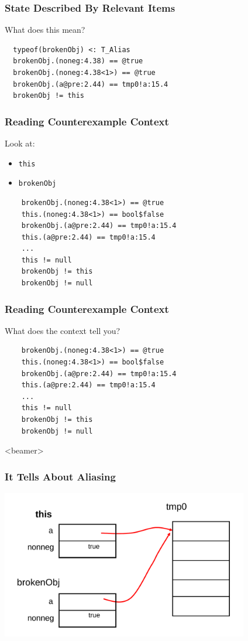 \begin{frame}[fragile]
\frametitle{State Described By Relevant Items}

\begin{question}
What does this mean?

\begin{verbatim}
  typeof(brokenObj) <: T_Alias
  brokenObj.(noneg:4.38) == @true
  brokenObj.(noneg:4.38<1>) == @true
  brokenObj.(a@pre:2.44) == tmp0!a:15.4
  brokenObj != this
\end{verbatim}
\end{question}
\end{frame}

\begin{frame}[fragile]
\frametitle{Reading Counterexample Context}

Look at:
\begin{itemize}
\item
\lstinline!this!

\item
\lstinline!brokenObj!
\end{itemize}

\begin{verbatim}
    brokenObj.(noneg:4.38<1>) == @true
    this.(noneg:4.38<1>) == bool$false
    brokenObj.(a@pre:2.44) == tmp0!a:15.4
    this.(a@pre:2.44) == tmp0!a:15.4
    ...
    this != null
    brokenObj != this
    brokenObj != null
\end{verbatim}
\end{frame}

\begin{frame}[fragile]
\frametitle{Reading Counterexample Context}

\begin{question}
What does the context tell you?
\end{question}
\begin{verbatim}
    brokenObj.(noneg:4.38<1>) == @true
    this.(noneg:4.38<1>) == bool$false
    brokenObj.(a@pre:2.44) == tmp0!a:15.4
    this.(a@pre:2.44) == tmp0!a:15.4
    ...
    this != null
    brokenObj != this
    brokenObj != null
\end{verbatim}
\end{frame}

\begin{frame}<beamer>
\frametitle{It Tells About Aliasing}
\includegraphics[width=4.25in]{alias-brokenobj}
\end{frame}

